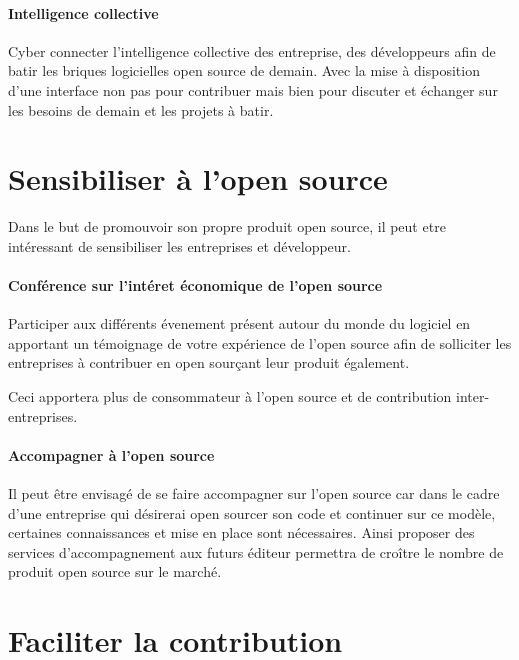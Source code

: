 	\paragraph{Intelligence collective\\}

	Cyber connecter l'intelligence collective des entreprise, des développeurs afin de batir les briques logicielles open source de demain. Avec la mise à disposition d'une interface non pas pour contribuer mais bien pour discuter et échanger sur les besoins de demain et les projets à batir.

\section{Sensibiliser à l'open source}

	Dans le but de promouvoir son propre produit open source, il peut etre intéressant de sensibiliser les entreprises et développeur.

	\paragraph{Conférence sur l'intéret économique de l'open source\\}

	Participer aux différents évenement présent autour du monde du logiciel en apportant un témoignage de votre expérience de l'open source afin de solliciter les entreprises à contribuer en open sourçant leur produit également.

	Ceci apportera plus de consommateur à l'open source et de contribution inter-entreprises.

	\paragraph{Accompagner à l'open source\\}

	Il peut être envisagé de se faire accompagner sur l'open source car dans le cadre d'une entreprise qui désirerai open sourcer son code et continuer sur ce modèle, certaines connaissances et mise en place sont nécessaires. Ainsi proposer des services d'accompagnement aux futurs éditeur permettra de croître le nombre de produit open source sur le marché.

\section{Faciliter la contribution}
	
